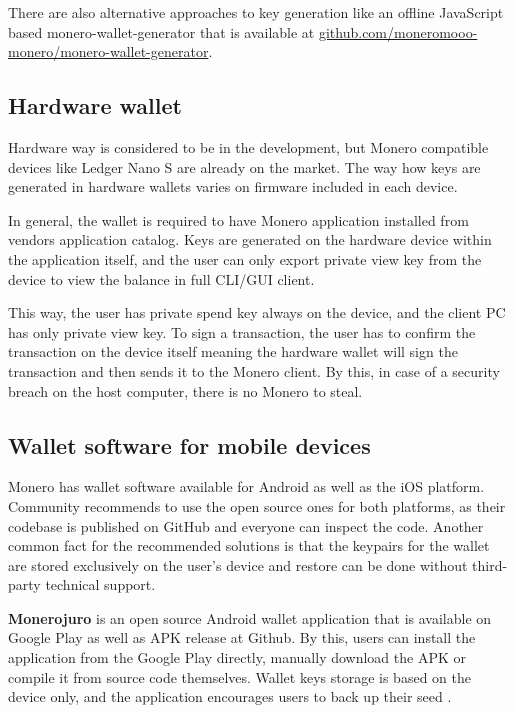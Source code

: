 \documentclass[
  printed, %
  table,   %
  lof,     %
  lot,     %
           oneside, color
]{fithesis3}
\begin{document}
There are also alternative approaches to key generation like an offline JavaScript based monero-wallet-generator that is available at \url{github.com/moneromooo-monero/monero-wallet-generator}.

\subsection{Hardware wallet}

Hardware way is considered to be in the development, but Monero compatible devices like Ledger Nano S are already on the market. The way how keys are generated in hardware wallets varies on firmware included in each device. 

In general, the wallet is required to have Monero application installed from vendors application catalog. Keys are generated on the hardware device within the application itself, and the user can only export private view key from the device to view the balance in full CLI/GUI client.

This way, the user has private spend key always on the device, and the client PC has only private view key. To sign a transaction, the user has to confirm the transaction on the device itself meaning the hardware wallet will sign the transaction and then sends it to the Monero client. By this, in case of a security breach on the host computer, there is no Monero to steal.

\subsection{Wallet software for mobile devices}
\label{sub:mobilewalletsoftware}

Monero has wallet software available for Android as well as the iOS platform. Community recommends to use the open source ones for both platforms, as their codebase is published on GitHub and everyone can inspect the code. Another common fact for the recommended solutions is that the keypairs for the wallet are stored exclusively on the user's device and restore can be done without third-party technical support.

\textbf{Monerojuro} is an open source Android wallet application that is available on Google Play as well as APK release at Github. By this, users can install the application from the Google Play directly, manually download the APK or compile it from source code themselves. Wallet keys storage is based on the device only, and the application encourages users to back up their seed \cite{xmrwalletgithub}.
\end{document}
